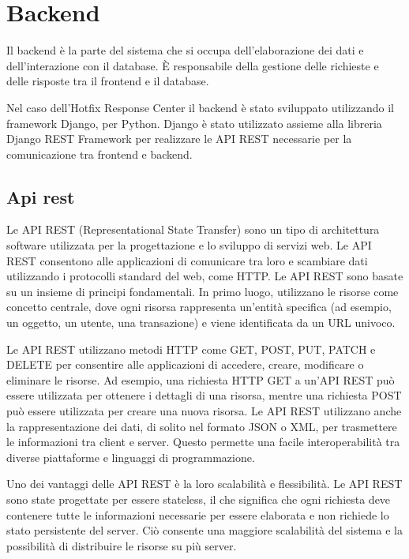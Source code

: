 \section{Backend}
Il backend è la parte del sistema che si occupa dell'elaborazione dei dati e 
dell'interazione con il database. È responsabile della gestione delle 
richieste e delle risposte tra il frontend e il database.

Nel caso dell’Hotfix Response Center il backend è stato sviluppato 
utilizzando il framework Django, per Python. Django è stato utilizzato assieme 
alla libreria Django REST Framework per realizzare le API REST necessarie per 
la comunicazione tra frontend e backend.


\subsection{Api rest}
Le API REST (Representational State Transfer) sono un tipo di architettura 
software utilizzata per la progettazione e lo sviluppo di servizi web. 
Le API REST consentono alle applicazioni di comunicare tra loro e 
scambiare dati utilizzando i protocolli standard del web, come HTTP. 
Le API REST sono basate su un insieme di principi fondamentali. 
In primo luogo, utilizzano le risorse come concetto centrale, dove ogni 
risorsa rappresenta un'entità specifica (ad esempio, un oggetto, un 
utente, una transazione) e viene identificata da un URL univoco.

Le API REST utilizzano metodi HTTP come GET, POST, PUT, PATCH e DELETE 
per consentire alle applicazioni di accedere, creare, modificare o 
eliminare le risorse. Ad esempio, una richiesta HTTP GET a un'API REST 
può essere utilizzata per ottenere i dettagli di una risorsa, mentre una 
richiesta POST può essere utilizzata per creare una nuova risorsa.
Le API REST utilizzano anche la rappresentazione dei dati, di solito nel 
formato JSON o XML, per trasmettere le informazioni tra client e server. 
Questo permette una facile interoperabilità tra diverse piattaforme e 
linguaggi di programmazione.

Uno dei vantaggi delle API REST è la loro scalabilità e flessibilità. 
Le API REST sono state progettate per essere stateless, il che significa 
che ogni richiesta deve contenere tutte le informazioni necessarie per 
essere elaborata e non richiede lo stato persistente del server. Ciò 
consente una maggiore scalabilità del sistema e la possibilità di 
distribuire le risorse su più server. ~\cite{wiki:api_rest}\\



